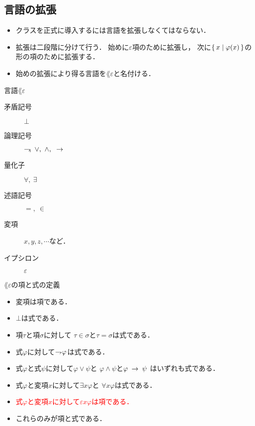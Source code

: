 \newpage
\subsection{言語の拡張}
	\begin{itemize}
	\setlength{\itemsep}{10pt}
		\item クラスを正式に導入するには言語を拡張しなくてはならない．
		\item 拡張は二段階に分けて行う．
			始めに$\varepsilon$項のために拡張し，
			次に$\left\{\, x \mid \varphi(x)\, \right\}$の形の項のために拡張する．
			
		\item 始めの拡張により得る言語を$\lang{\varepsilon}$と名付ける．
	\end{itemize}

	\begin{itembox}[l]{言語$\lang{\varepsilon}$}
		\begin{description}
			\item[矛盾記号] $\bot$
			\item[論理記号] $\negation,\ \vee,\ \wedge,\ \rarrow$
			\item[量化子] $\forall,\ \exists$
			\item[述語記号] $=,\ \in$
			\item[変項] $x,y,z,\cdots$など．
			\item[イプシロン] $\varepsilon$
		\end{description}
	\end{itembox}
	
\newpage
	\begin{itembox}[l]{$\lang{\varepsilon}$の項と式の定義}
		\begin{itemize}
			\item 変項は項である．
			\item $\bot$は式である．
			\item 項$\tau$と項$\sigma$に対して
				$\tau \in \sigma$と$\tau = \sigma$は式である．
			\item 式$\varphi$に対して$\rightharpoondown\hspace{-0.25em} \varphi$は式である．
			\item 式$\varphi$と式$\psi$に対して$\varphi \vee \psi$と
				$\varphi \wedge \psi$と$\varphi \hspace{0.25em}\rightarrow\hspace{0.25em} \psi$
				はいずれも式である．
			\item 式$\varphi$と変項$x$に対して$\exists x \varphi$と
				$\forall x \varphi$は式である．
			\item \textcolor{red}{式$\varphi$と変項$x$に対して$\varepsilon x \varphi$は項である．}
			\item これらのみが項と式である．
		\end{itemize}
	\end{itembox}
	
